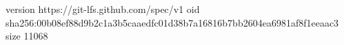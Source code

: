 version https://git-lfs.github.com/spec/v1
oid sha256:00b08ef88d9b2c1a3b5caaedfc01d38b7a16816b7bb2604ea6981af8f1eeaac3
size 11068
